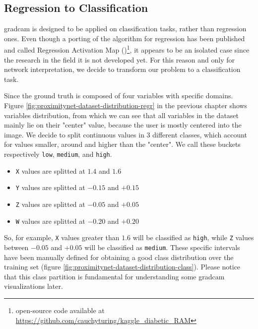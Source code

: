 \subsection{Regression to Classification}
\label{subsec:gradcam-regrtoclass}

\gls{gradcam} is designed to be applied on classification tasks, rather than regression ones. Even though a porting of the algorithm for regression has been published and called Regression Activation Map (\cite{wang2019diabetic})\footnote{open-source code available at \url{https://github.com/cauchyturing/kaggle_diabetic_RAM}}, it appears to be an isolated case since the research in the field it is not developed yet. For this reason and only for network interpretation, we decide to transform our problem to a classification task.

Since the ground truth is composed of four variables with specific domains. Figure \ref{fig:proximitynet-dataset-distribution-regr} in the previous chapter shows variables distribution, from which we can see that all variables in the dataset mainly lie on their "center" value, because the user is mostly centered into the image. We decide to split continuous values in 3 different classes, which account for values smaller, around and higher than the "center". We call these buckets respectively \texttt{low}, \texttt{medium}, and \texttt{high}.

\begin{itemize}
	\item \texttt{X} values are splitted at $1.4$ and $1.6$
	\item \texttt{Y} values are splitted at $-0.15$ and $+0.15$
	\item \texttt{Z} values are splitted at $-0.05$ and $+0.05$
	\item \texttt{W} values are splitted at $-0.20$ and $+0.20$
\end{itemize}

So, for example, \texttt{X} values greater than $1.6$ will be classified as \texttt{high}, while \texttt{Z} values between $-0.05$ and $+0.05$ will be classified as \texttt{medium}. These specific intervals have been manually defined for obtaining a good class distribution over the training set (figure \ref{fig:proximitynet-dataset-distribution-class}). Please notice that this class partition is fundamental for understanding some \gls{gradcam} visualizations later.

